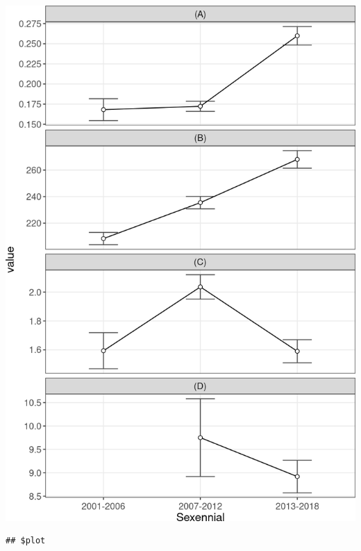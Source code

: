 \documentclass[10pt,landscape,a3paper]{article}
\begin{document}
\begin{center}\includegraphics{img/modelling/aa-eda-ts-16} \end{center}

\begin{verbatim}
## $plot
\end{verbatim}
\end{document}
